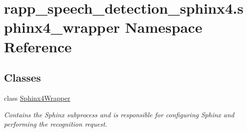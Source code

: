 \hypertarget{namespacerapp__speech__detection__sphinx4_1_1sphinx4__wrapper}{\section{rapp\-\_\-speech\-\_\-detection\-\_\-sphinx4.\-sphinx4\-\_\-wrapper Namespace Reference}
\label{namespacerapp__speech__detection__sphinx4_1_1sphinx4__wrapper}
}
\subsection*{Classes}
\begin{DoxyCompactItemize}
\item 
class \hyperlink{classrapp__speech__detection__sphinx4_1_1sphinx4__wrapper_1_1Sphinx4Wrapper}{Sphinx4\-Wrapper}
\begin{DoxyCompactList}\small\item\em Contains the Sphinx subprocess and is responsible for configuring Sphinx and performing the recognition request. \end{DoxyCompactList}\end{DoxyCompactItemize}
